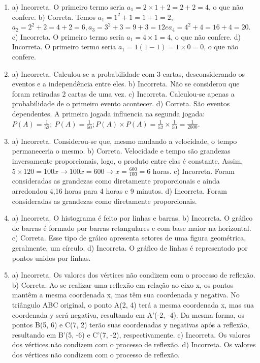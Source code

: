 \begin{enumerate}
\item a) Incorreta. O primeiro termo seria
$a_{1} = 2 \times 1 + 2 = 2 + 2 = 4$, o que não confere.
b) Correta. Temos $a_{1} = 1^{2} + 1 = 1 + 1 = 2$,
$a_{2} = 2^{2} + 2 = 4 + 2 = 6, a_{3} = 3^{2} + 3 = 9 + 3 = 12 e a_{4} = 4^2 + 4 = 16 + 4 = 20$.
c) Incorreta. O primeiro termo seria $a_{1} = 4 \times 1 = 4$, o que não confere.
d) Incorreta. O primeiro termo seria
$a_{1} = 1\left( 1 - 1 \right) = 1 \times 0 = 0$, o que não confere.


\item a) Incorreta. Calculou-se a probabilidade com 3 cartas, desconsiderando os eventos e a independência entre eles.
b) Incorreta. Não se considerou que foram retiradas 2 cartas de uma vez.
c) Incorreta. Calculou-se apenas a probabilidade de o primeiro evento acontecer.
d) Correta. São eventos dependentes. A primeira jogada influencia na segunda jogada: $P\left( A \right) = \frac{1}{52};\ P\left( A \right) = \frac{1}{50}; P\left( A \right) \times P\left( A \right) = \frac{1}{52} \times \frac{1}{50} = \frac{1}{2600}$.


\item a) Incorreta. Considerou-se que, mesmo mudando a velocidade, o tempo permaneceria o mesmo.
b) Correta. Velocidade e tempo são grandezas inversamente proporcionais, logo, o produto entre elas é constante. Assim,
$5 \times 120 = 100x \rightarrow 100x = 600 \rightarrow x = \frac{600}{100} = 6$ horas.
c) Incorreta. Foram consideradas as grandezas como diretamente proporcionais e ainda arredondou 4,16 horas para 4 horas e 9 minutos.
d) Incorreta. Foram consideradas as grandezas como diretamente proporcionais.


\item a) Incorreta. O histograma é feito por linhas e barras.
b) Incorreta. O gráfico de barras é formado por barras
retangulares e com base maior na horizontal.
c) Correta. Esse tipo de gráico apresenta setores de uma figura geométrica, geralmente, um círculo.
d) Incorreta. O gráfico de linhas é representado por pontos unidos por linhas.


\item a) Incorreta. Os valores dos vértices não condizem com o processo de reflexão.
b) Correta. Ao se realizar uma reflexão em relação ao eixo x, os pontos mantêm a mesma coordenada x, mas têm sua coordenada y negativa.
No triângulo ABC original, o ponto A(2, 4) terá a mesma coordenada x, mas sua coordenada y será negativa, resultando em A'(-2, -4). Da mesma
forma, os pontos B(5, 6) e C(7, 2) terão suas coordenadas y negativas
após a reflexão, resultando em B'(5, -6) e C'(7, -2), respectivamente.
c) Incorreta. Os valores dos vértices não condizem com o processo de reflexão.
d) Incorreta. Os valores dos vértices não condizem com o processo de reflexão.
\end{enumerate}

